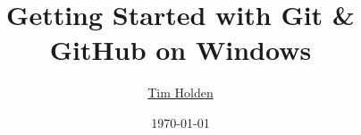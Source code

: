 \title{\textbf{Getting Started with Git \& GitHub on Windows}}
\author{\href{https://github.com/th1622EE?tab=repositories}{Tim Holden}}
\date{\today}
